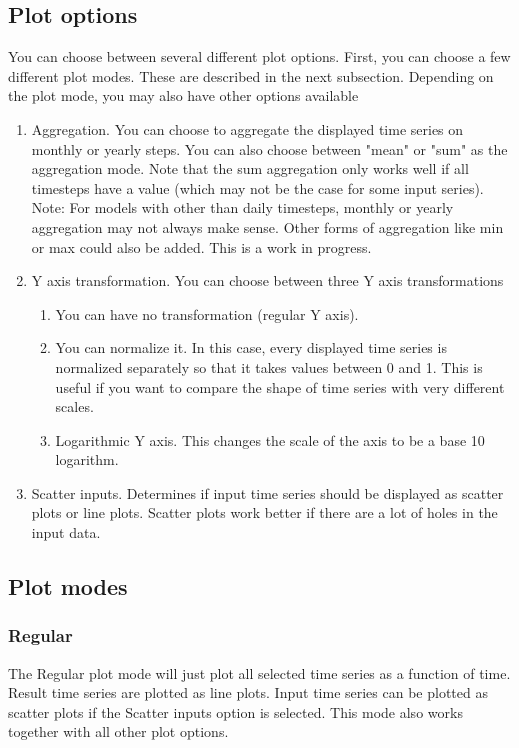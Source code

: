 \documentclass[11pt]{article}
\theoremstyle{definition}
\begin{document}
\subsection{Plot options}
You can choose between several different plot options. First, you can choose a few different plot modes. These are described in the next subsection. Depending on the plot mode, you may also have other options available

\begin{enumerate}[i]
\item Aggregation. You can choose to aggregate the displayed time series on monthly or yearly steps. You can also choose between "mean" or "sum" as the aggregation mode. Note that the sum aggregation only works well if all timesteps have a value (which may not be the case for some input series). Note: For models with other than daily timesteps, monthly or yearly aggregation may not always make sense. Other forms of aggregation like min or max could also be added. This is a work in progress.
\item Y axis transformation. You can choose between three Y axis transformations
\begin{enumerate}
\item You can have no transformation (regular Y axis).
\item You can normalize it. In this case, every displayed time series is normalized separately so that it takes values between 0 and 1. This is useful if you want to compare the shape of time series with very different scales.
\item Logarithmic Y axis. This changes the scale of the axis to be a base 10 logarithm.
\end{enumerate}
\item Scatter inputs. Determines if input time series should be displayed as scatter plots or line plots. Scatter plots work better if there are a lot of holes in the input data.
\end{enumerate}

\subsection{Plot modes}

\subsubsection{Regular}

The Regular plot mode will just plot all selected time series as a function of time. Result time series are plotted as line plots. Input time series can be plotted as scatter plots if the Scatter inputs option is selected. This mode also works together with all other plot options.
\end{document}
